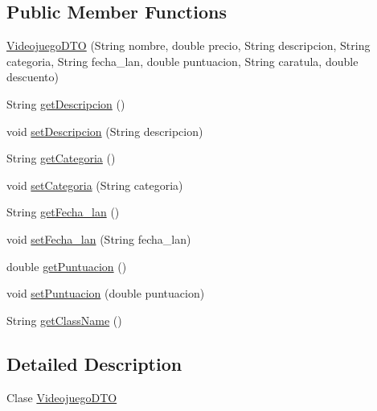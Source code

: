 \subsection*{Public Member Functions}
\begin{DoxyCompactItemize}
\item 
\mbox{\hyperlink{classes_1_1deusto_1_1server_1_1dto_1_1_videojuego_d_t_o_a066a00876e21fd3bd06eb82b6cfb8d0b}{Videojuego\+D\+TO}} (String nombre, double precio, String descripcion, String categoria, String fecha\+\_\+lan, double puntuacion, String caratula, double descuento)
\item 
String \mbox{\hyperlink{classes_1_1deusto_1_1server_1_1dto_1_1_videojuego_d_t_o_a16ea15ebcfa5fa52feebbc5b9a371fe5}{get\+Descripcion}} ()
\item 
void \mbox{\hyperlink{classes_1_1deusto_1_1server_1_1dto_1_1_videojuego_d_t_o_a6e98b4e05f9df9cbfc4880a717c51de5}{set\+Descripcion}} (String descripcion)
\item 
String \mbox{\hyperlink{classes_1_1deusto_1_1server_1_1dto_1_1_videojuego_d_t_o_a7f50b2c8a2f6e14959a72608bdaaccf9}{get\+Categoria}} ()
\item 
void \mbox{\hyperlink{classes_1_1deusto_1_1server_1_1dto_1_1_videojuego_d_t_o_a696bd10262e4c4048d30d25b51ad4942}{set\+Categoria}} (String categoria)
\item 
String \mbox{\hyperlink{classes_1_1deusto_1_1server_1_1dto_1_1_videojuego_d_t_o_a373cb7cfe152cdf5a24ec2a58a01e955}{get\+Fecha\+\_\+lan}} ()
\item 
void \mbox{\hyperlink{classes_1_1deusto_1_1server_1_1dto_1_1_videojuego_d_t_o_a97c24eeac497cdaffe290b623dd4e4de}{set\+Fecha\+\_\+lan}} (String fecha\+\_\+lan)
\item 
double \mbox{\hyperlink{classes_1_1deusto_1_1server_1_1dto_1_1_videojuego_d_t_o_a4eeabdcb0cf43059f53c1689d38f374d}{get\+Puntuacion}} ()
\item 
void \mbox{\hyperlink{classes_1_1deusto_1_1server_1_1dto_1_1_videojuego_d_t_o_a2ac10b3f4b30b36da2a352797c70c854}{set\+Puntuacion}} (double puntuacion)
\item 
String \mbox{\hyperlink{classes_1_1deusto_1_1server_1_1dto_1_1_videojuego_d_t_o_a5b08cb286b4a1c9a8643fddf677cd81b}{get\+Class\+Name}} ()
\end{DoxyCompactItemize}


\subsection{Detailed Description}
Clase \mbox{\hyperlink{classes_1_1deusto_1_1server_1_1dto_1_1_videojuego_d_t_o}{Videojuego\+D\+TO}} 

